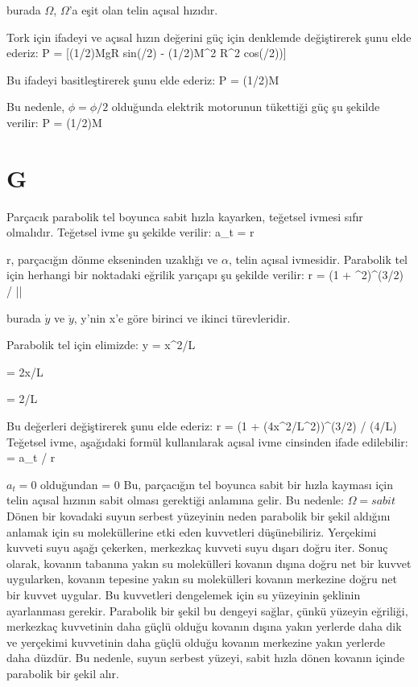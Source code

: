\documentclass[12pt]{article}
\begin{document}
burada $\Omega$, $\Omega$'a eşit olan telin açısal hızıdır.

Tork için ifadeyi ve açısal hızın değerini güç için denklemde değiştirerek şunu elde ederiz:
\bigbreak
P = [(1/2)MgR sin(\phi/2) - (1/2)M\Omega^2 R^2 cos(\phi/2))]\Omega

Bu ifadeyi basitleştirerek şunu elde ederiz:
\bigbreak
P = (1/2)M

Bu nedenle, $\phi = \phi/2$ olduğunda elektrik motorunun tükettiği güç şu şekilde verilir:
\bigbreak
P = (1/2)M
\newpage
\section{G}
Parçacık parabolik tel boyunca sabit hızla kayarken, teğetsel ivmesi sıfır olmalıdır. Teğetsel ivme şu şekilde verilir:
\bigbreak
a_t = r \alpha

r, parçacığın dönme ekseninden uzaklığı ve $\alpha$, telin açısal ivmesidir.
Parabolik tel için herhangi bir noktadaki eğrilik yarıçapı şu şekilde verilir:
\bigbreak
r = (1 + ^2)^(3/2) / ||

burada $\dot{y}$ ve $\ddot{y}$, y'nin x'e göre birinci ve ikinci türevleridir.

Parabolik tel için elimizde:
\bigbreak
y = x^2/L

 = 2x/L

 = 2/L

Bu değerleri değiştirerek şunu elde ederiz:
\bigbreak
r = (1 + (4x^2/L^2))^(3/2) / (4/L)
\newpage
Teğetsel ivme, aşağıdaki formül kullanılarak açısal ivme cinsinden ifade edilebilir:
\bigbreak
\alpha = a_t / r

$a_t = 0$ olduğundan \alpha = 0
\bigbreak
Bu, parçacığın tel boyunca sabit bir hızla kayması için telin açısal hızının sabit olması gerektiği anlamına gelir. Bu nedenle: $\Omega = sabit$
\bigbreak
Dönen bir kovadaki suyun serbest yüzeyinin neden parabolik bir şekil aldığını anlamak için su moleküllerine etki eden kuvvetleri düşünebiliriz. Yerçekimi kuvveti suyu aşağı çekerken, merkezkaç kuvveti suyu dışarı doğru iter. Sonuç olarak, kovanın tabanına yakın su molekülleri kovanın dışına doğru net bir kuvvet uygularken, kovanın tepesine yakın su molekülleri kovanın merkezine doğru net bir kuvvet uygular. Bu kuvvetleri dengelemek için su yüzeyinin şeklinin ayarlanması gerekir. Parabolik bir şekil bu dengeyi sağlar, çünkü yüzeyin eğriliği, merkezkaç kuvvetinin daha güçlü olduğu kovanın dışına yakın yerlerde daha dik ve yerçekimi kuvvetinin daha güçlü olduğu kovanın merkezine yakın yerlerde daha düzdür. Bu nedenle, suyun serbest yüzeyi, sabit hızla dönen kovanın içinde parabolik bir şekil alır.
\end{document}

